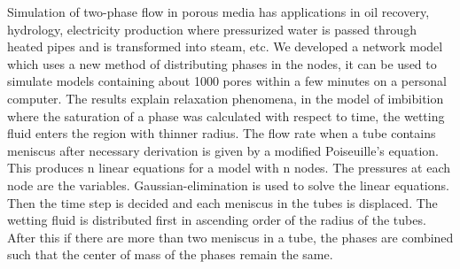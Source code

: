 Simulation of two-phase flow in porous media has applications in oil recovery, hydrology, electricity production where pressurized water is passed through heated pipes and is transformed into steam, etc. We developed a network model which uses a new method of distributing phases in the nodes, it can be used to simulate models containing about 1000 pores within a few minutes on a personal computer. The results explain relaxation phenomena, in the model of imbibition where the saturation of a phase was calculated with respect to time, the wetting fluid enters the region with thinner radius. The flow rate when a tube contains meniscus after necessary derivation is given by a modified Poiseuille’s equation. This produces n linear equations for a model with n nodes. The pressures at each node are the variables. Gaussian-elimination is used to solve the linear equations. Then the time step is decided and each meniscus in the tubes is displaced. The wetting fluid is distributed first in ascending order of the radius of the tubes. After this if there are more than two meniscus in a tube, the phases are combined such that the center of mass of the phases remain the same.  

